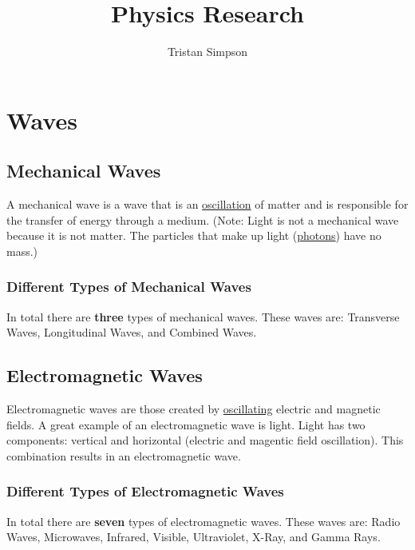 \documentclass{article}
\title{Physics Research}
\author{Tristan Simpson}
\begin{document}
\maketitle
\tableofcontents
\section{Waves}
\subsection{Mechanical Waves}
A mechanical wave is a wave that is an \hyperref[sec:oscillation]{oscillation} of matter and is responsible for the transfer of energy through a medium. (Note: Light is not a mechanical wave because it is not matter. The particles that make up light (\hyperref[sec:photons]{photons}) have no mass.)

\subsubsection{Different Types of Mechanical Waves}
In total there are \textbf{three} types of mechanical waves. These waves are: Transverse Waves, Longitudinal Waves, and Combined Waves.

\subsection{Electromagnetic Waves}
Electromagnetic waves are those created by \hyperref[sec:oscillation]{oscillating} electric and magnetic fields. A great example of an electromagnetic wave is light. Light has two components: vertical and horizontal (electric and magentic field oscillation). This combination results in an electromagnetic wave.

\subsubsection{Different Types of Electromagnetic Waves}
In total there are \textbf{seven} types of electromagnetic waves. These waves are: Radio Waves, Microwaves, Infrared, Visible, Ultraviolet, X-Ray, and Gamma Rays.
\end{document}
